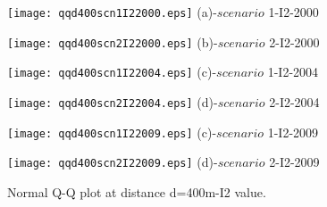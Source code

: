 
\begin{figure}
     \begin{minipage}[h]{0.5\linewidth}
        \centering
        \texttt{[image: qqd400scn1I22000.eps]}
				\footnotesize{(a)-$scenario$ 1-I2-2000}
     \end{minipage}
\vspace{5.00mm}
    \begin{minipage}[h]{0.5\linewidth}
       \centering
       \texttt{[image: qqd400scn2I22000.eps]}
			\footnotesize{(b)-$scenario$ 2-I2-2000}
     \end{minipage}
\vspace{5.00mm}
    \begin{minipage}[h]{0.5\linewidth}
       \centering
       \texttt{[image: qqd400scn1I22004.eps]}
			\footnotesize{(c)-$scenario$ 1-I2-2004}
     \end{minipage}
\vspace{3.00mm}
    \begin{minipage}[h]{0.5\linewidth}
       \centering
       \texttt{[image: qqd400scn2I22004.eps]}
			\footnotesize{(d)-$scenario$ 2-I2-2004}
     \end{minipage}
	\vspace{3.00mm}
    \begin{minipage}[h]{0.5\linewidth}
       \centering
       \texttt{[image: qqd400scn1I22009.eps]}
			\footnotesize{(c)-$scenario$ 1-I2-2009}
     \end{minipage}
\vspace{3.00mm}
    \begin{minipage}[h]{0.5\linewidth}
       \centering
       \texttt{[image: qqd400scn2I22009.eps]}
			\footnotesize{(d)-$scenario$ 2-I2-2009}
     \end{minipage}
		\caption{Normal Q-Q plot at distance d=400m-I2 value.}
\label{fig14}
\end{figure}

